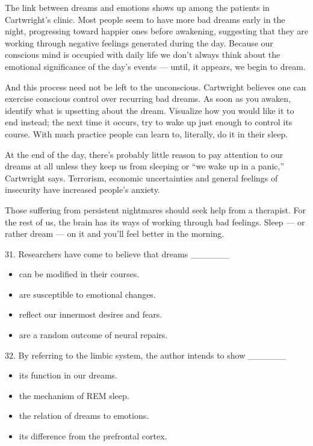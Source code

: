 \documentclass[UTF8,11pt]{ctexart}
\begin{document}
The link between dreams and emotions shows up among the patients in Cartwright’s clinic. Most people seem to have more bad dreams early in the night, progressing toward happier ones before awakening, suggesting that they are working through negative feelings generated during the day. Because our conscious mind is occupied with daily life we don’t always think about the emotional significance of the day’s events — until, it appears, we begin to dream.


And this process need not be left to the unconscious. Cartwright believes one can exercise conscious control over recurring bad dreams. As soon as you awaken, identify what is upsetting about the dream. Visualize how you would like it to end instead; the next time it occurs, try to wake up just enough to control its course. With much practice people can learn to, literally, do it in their sleep.


At the end of the day, there’s probably little reason to pay attention to our dreams at all unless they keep us from sleeping or “we wake up in a panic,” Cartwright says. Terrorism, economic uncertainties and general feelings of insecurity have increased people’s anxiety.


Those suffering from persistent nightmares should seek help from a therapist. For the rest of us, the brain has its ways of working through bad feelings. Sleep — or rather dream — on it and you’ll feel better in the morning.


31. Researchers have come to believe that dreams \_\_\_\_\_\_


\begin{itemize}[leftmargin=2em,itemsep=.2em,topsep=.4em]\item[A.] can be modified in their courses.
\item[B.] are susceptible to emotional changes.
\item[C.] reflect our innermost desires and fears.
\item[D.] are a random outcome of neural repairs.
\end{itemize}

32. By referring to the limbic system, the author intends to show \_\_\_\_\_\_


\begin{itemize}[leftmargin=2em,itemsep=.2em,topsep=.4em]\item[A.] its function in our dreams.
\item[B.] the mechanism of REM sleep.
\item[C.] the relation of dreams to emotions.
\item[D.] its difference from the prefrontal cortex.
\end{itemize}
\end{document}
